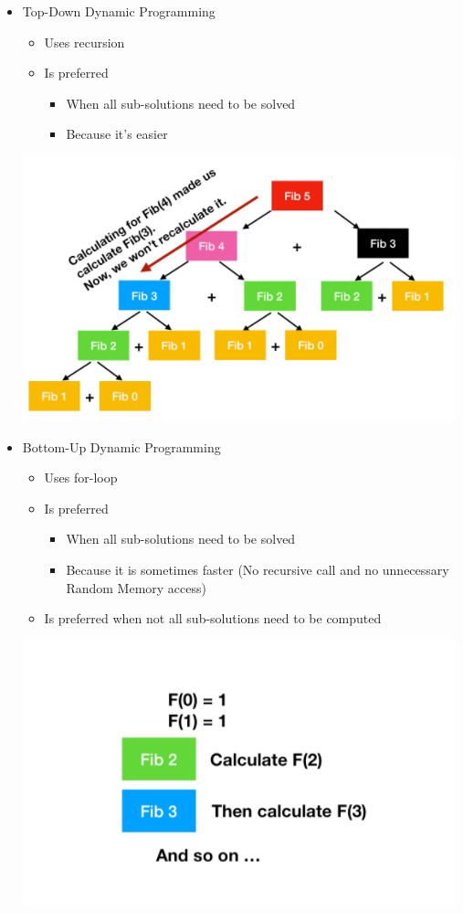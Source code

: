 \documentclass[12pt]{article}
\begin{document}
\begin{enumerate}[1.]
\begin{itemize}
        \item Top-Down Dynamic Programming
        \begin{itemize}
            \item Uses recursion
            \item Is preferred
            \begin{itemize}
                \item When all sub-solutions need to be solved
                \item Because it's easier
            \end{itemize}
        \end{itemize}


        \begin{center}
        \includegraphics[width=0.7\linewidth]{images/worksheet_3_solution_8.png}
        \end{center}

        \item Bottom-Up Dynamic Programming
        \begin{itemize}
            \item Uses for-loop
            \item Is preferred
            \begin{itemize}
                \item When all sub-solutions need to be solved
                \item Because it is sometimes faster (No recursive call and no unnecessary Random Memory access)
            \end{itemize}
            \item Is preferred when not all sub-solutions need to be computed
        \end{itemize}

        \begin{center}
        \includegraphics[width=0.7\linewidth]{images/worksheet_3_solution_9.png}
        \end{center}


\end{itemize}
\end{enumerate}
\end{document}
